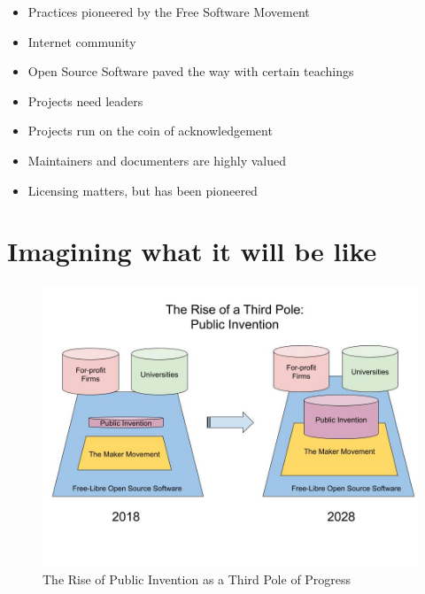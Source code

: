 \documentclass[
	fontsize=10pt, %
	twoside=false, %
	secnumdepth=1, %
]{kaobook}
\begin{document}
\begin{itemize}
\item Practices pioneered by the Free Software Movement
\item Internet community
\item Open Source Software paved the way with certain teachings
\item Projects need leaders
\item Projects run on the coin of acknowledgement
\item Maintainers and documenters are highly valued
\item Licensing matters, but has been pioneered
\end{itemize}

\chapter{Imagining what it will be like}


\begin{figure}
  \includegraphics{figures/The_Rise_of_Public_Invention.jpg}
  \caption{The Rise of Public Invention as a Third Pole of Progress}
\end{figure}
\end{document}

